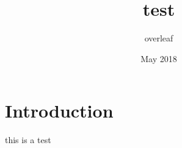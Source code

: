 \documentclass{article}
\title{test}
\author{overleaf }
\date{May 2018}
\begin{document}
\maketitle

\section{Introduction}
this is a test
\end{document}
